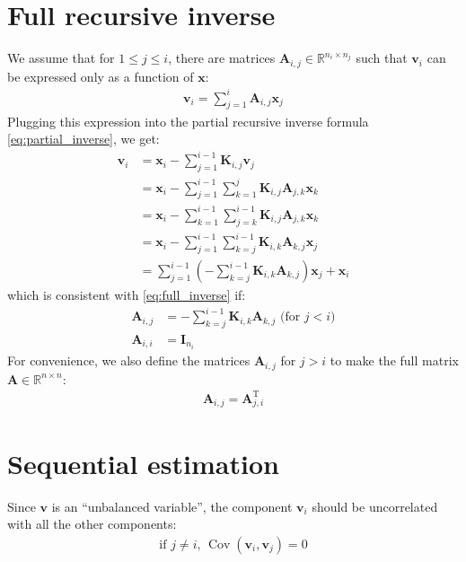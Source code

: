 \documentclass[12pt]{scrartcl}
\DeclareMathOperator{\Cov}{Cov}
\begin{document}
\section{Full recursive inverse}
We assume that for $1 \le j \le i$, there are matrices $\mathbf{A}_{i, j} \in \mathbb{R}^{n_i \times n_j}$ such that $\mathbf{v}_i$ can be expressed only as a function of $\mathbf{x}$:
\begin{align}
\label{eq:full_inverse}
\mathbf{v}_i = \sum_{j=1}^i \mathbf{A}_{i,j} \mathbf{x}_j
\end{align}
Plugging this expression into the partial recursive inverse formula \eqref{eq:partial_inverse}, we get:
\begin{align}
\mathbf{v}_i & = \mathbf{x}_i - \sum_{j=1}^{i-1} \mathbf{K}_{i,j} \mathbf{v}_j \nonumber \\
& = \mathbf{x}_i - \sum_{j=1}^{i-1} \sum_{k=1}^j \mathbf{K}_{i,j} \mathbf{A}_{j,k} \mathbf{x}_k \nonumber \\
& = \mathbf{x}_i - \sum_{k=1}^{i-1} \sum_{j=k}^{i-1} \mathbf{K}_{i,j} \mathbf{A}_{j,k} \mathbf{x}_k \nonumber \\
& = \mathbf{x}_i - \sum_{j=1}^{i-1} \sum_{k=j}^{i-1} \mathbf{K}_{i,k} \mathbf{A}_{k,j} \mathbf{x}_j \nonumber \\
& =\sum_{j=1}^{i-1} \left(-\sum_{k=j}^{i-1} \mathbf{K}_{i,k} \mathbf{A}_{k,j}\right) \mathbf{x}_j + \mathbf{x}_i
\end{align}
which is consistent with \eqref{eq:full_inverse} if:
\begin{subequations}
\begin{align}
\mathbf{A}_{i,j} & = - \sum_{k=j}^{i-1} \mathbf{K}_{i,k} \mathbf{A}_{k,j} \text{ (for }j < i\text{)}\\
\mathbf{A}_{i,i} & = \mathbf{I}_{n_i}
\end{align}
\end{subequations}
For convenience, we also define the matrices $\mathbf{A}_{i,j}$ for $j > i$ to make the full matrix $\mathbf{A} \in \mathbb{R}^{n \times n}$:
\begin{align}
\mathbf{A}_{i,j} = \mathbf{A}_{j,i}^\mathrm{T}
\end{align}

\section{Sequential estimation}
Since $\mathbf{v}$ is an ``unbalanced variable'', the component $\mathbf{v}_i$ should be uncorrelated with all the other components:
\begin{align}
\label{eq:stat_prop}
\text{if } j \ne i \text{, }\Cov\left(\mathbf{v}_i, \mathbf{v}_j\right) = 0
\end{align}
\end{document}
